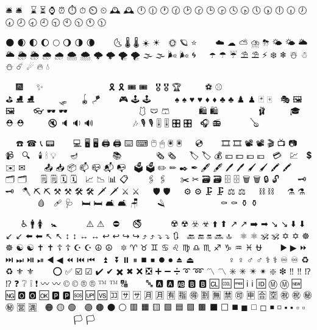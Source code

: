 \documentclass {article}
\begin{document}
{🛎️   🛎   🧳  ⌛  ⏳  ⌚  ⏰  ⏱️   ⏱   ⏲️   ⏲   🕰️   🕰   🕛  🕧  🕐  🕜  🕑  🕝  🕒  🕞  🕓
🕟  🕔  🕠  🕕  🕡  🕖  🕢  🕗  🕣  🕘  🕤  🕙  🕥  🕚  🕦

🌑  🌒  🌓  🌔  🌕  🌖  🌗  🌘  🌙  🌚  🌛  🌜  🌡️   🌡   ☀️   ☀   🌝  🌞  🪐  ⭐  🌟  🌠
🌌  ☁️   ☁   ⛅  ⛈️   ⛈   🌤️   🌤   🌥️   🌥   🌦️   🌦   🌧️   🌧   🌨️   🌨   🌩️   🌩   🌪️   🌪   🌫️   🌫
🌬️   🌬   🌀  🌈  🌂  ☂️   ☂   ☔  ⛱️   ⛱   ⚡  ❄️   ❄   ☃️   ☃   ⛄  ☄️   ☄   🔥  💧  🌊

🎃  🎄  🎆  🎇  🧨  ✨  🎈  🎉  🎊  🎋  🎍  🎎  🎏  🎐  🎑  🧧  🎀  🎁  🎗️   🎗   🎟️
🎟 🎫  🎖️   🎖   🏆  🏅  🥇  🥈  🥉 ⚽  ⚾  🥎  🏀  🏐  🏈  🏉  🎾  🥏  🎳  🏏  🏑  🏒
🥍  🏓  🏸  🥊  🥋  🥅  ⛳  ⛸️  ⛸ 🎣  🤿  🎽  🎿  🛷  🥌  🎯  🪀  🪁  🎱  🔮  🧿  🎮
🕹️  🕹  🎰  🎲  🧩  🧸  ♠️  ♠  ♥️  ♥ ♦️  ♦  ♣️  ♣  ♟️  ♟  🃏  🀄  🎴  🎭  🖼️  🖼  🎨  🧵
🧶 👓  🕶️  🕶  🥽  🥼  🦺  👔  👕  👖  🧣  🧤  🧥  🧦  👗  👘  🥻  🩱  🩲  🩳  👙  👚
👛 👜  👝  🛍️  🛍  🎒  👞  👟  🥾  🥿  👠  👡  🩰  👢  👑  👒  🎩  🎓  🧢  ⛑️  ⛑  📿
💄 💍  💎  🔇  🔈  🔉  🔊  📢  📣  📯  🔔  🔕  🎼  🎵  🎶  🎙️  🎙  🎚️  🎚  🎛️  🎛  🎤
🎧 📻  🎷  🎸  🎹  🎺  🎻  🪕  🥁

📱  📲  ☎️  ☎  📞  📟  📠  🔋  🔌  💻  🖥️  🖥  🖨️  🖨  ⌨️  ⌨  🖱️  🖱  🖲️  🖲  💽  💾  💿
📀  🧮  🎥  🎞️  🎞  📽️  📽  🎬  📺  📷  📸  📹  📼  🔍  🔎  🕯️  🕯  💡  🔦  🏮  🪔  📔
📕  📖  📗  📘  📙  📚  📓  📒  📃  📜  📄  📰  🗞️  🗞  📑  🔖  🏷️  🏷  💰  💴  💵  💶
💷  💸  💳  🧾  💹  💱  💲  ✉️  ✉  📧  📨  📩  📤  📥  📦  📫  📪  📬  📭  📮  🗳️  🗳
✏️  ✏  ✒️  ✒  🖋️  🖋  🖊️  🖊  🖌️  🖌  🖍️  🖍  📝  💼  📁  📂  🗂️  🗂  📅  📆  🗒️  🗒  🗓️
🗓  📇  📈  📉  📊  📋  📌  📍  📎  🖇️  🖇  📏  📐  ✂️  ✂  🗃️  🗃  🗄️  🗄  🗑️  🗑  🔒
🔓  🔏  🔐  🔑  🗝️  🗝  🔨  🪓  ⛏️  ⛏  ⚒️  ⚒  🛠️  🛠  🗡️  🗡  ⚔️  ⚔  🔫  🏹  🛡️  🛡  🔧
🔩  ⚙️  ⚙  🗜️  🗜  ⚖️  ⚖  🦯  🔗  ⛓️  ⛓  🧰  🧲  ⚗️  ⚗  🧪  🧫  🧬  🔬  🔭  📡  💉  🩸  💊
🩹  🩺  🚪  🛏️  🛏  🛋️  🛋  🪑  🚽  🚿  🛁  🪒  🧴  🧷  🧹  🧺  🧻  🧼  🧽  🧯  🛒  🚬
⚰️  ⚰  ⚱️  ⚱  🗿

🏧  🚮  🚰  ♿  🚹  🚺  🚻  🚼  🚾  🛂  🛃  🛄  🛅  ⚠️  ⚠  🚸  ⛔  🚫  🚳  🚭  🚯  🚱
🚷  📵  🔞  ☢️  ☢  ☣️  ☣    ⬆️  ⬆  ↗️  ↗  ➡️  ➡  ↘️  ↘  ⬇️  ⬇  ↙️  ↙  ⬅️  ⬅  ↖️  ↖  ↕️  ↕  ↔️  ↔
↩️  ↩  ↪️  ↪  ⤴️  ⤴  ⤵️  ⤵  🔃  🔄  🔙  🔚  🔛  🔜  🔝  🛐  ⚛️  ⚛  🕉️  🕉  ✡️  ✡  ☸️  ☸  ☯️  ☯
✝️  ✝  ☦️  ☦  ☪️  ☪  ☮️  ☮  🕎  🔯  ♈  ♉  ♊  ♋  ♌  ♍  ♎  ♏  ♐  ♑  ♒  ♓  ⛎  🔀
🔁  🔂  ▶️  ▶  ⏩  ⏭️  ⏭  ⏯️  ⏯  ◀️  ◀  ⏪  ⏮️  ⏮  🔼  ⏫  🔽  ⏬  ⏸️  ⏸  ⏹️  ⏹  ⏺️  ⏺  ⏏️  ⏏
🎦  🔅  🔆  📶  📳  📴  ♀️  ♀  ♂️  ♂    ⚕️  ⚕  ♾️  ♾  ♻️  ♻  ⚜️  ⚜  🔱  📛  🔰  ⭕  ✅  ☑️  ☑
✔️  ✔  ✖️  ✖  ❌  ❎  ➕  ➖  ➗  ➰  ➿  〽️  〽  ✳️  ✳  ✴️  ✴  ❇️  ❇  ‼️  ‼  ⁉️  ⁉  ❓  ❔
❕  ❗  〰️  〰  ©️  ©  ®️  ®  ™️  ™    🔠  🔡  🔢  🔣  🔤  🅰️  🅰  🆎  🅱️  🅱  🆑  🆒  🆓  ℹ️
ℹ  🆔  Ⓜ️  Ⓜ  🆕  🆖  🅾️  🅾  🆗  🅿️  🅿  🆘  🆙  🆚  🈁  🈂️  🈂  🈷️  🈷  🈶  🈯  🉐  🈹
🈚  🈲  🉑  🈸  🈴  🈳  ㊗️  ㊗  ㊙️  ㊙  🈺  🈵  🔴  🟠  🟡  🟢  🔵  🟣  🟤  ⚫  ⚪  🟥
🟧  🟨  🟩  🟦  🟪  🟫  ⬛  ⬜  ◼️  ◼  ◻️  ◻  ◾  ◽  ▪️  ▪  ▫️  ▫  🔶  🔷  🔸  🔹  🔺  🔻
💠  🔘  🔳  🔲  🏁  🚩  🎌  🏴  🏳️  🏳  🏴  🏴  🏴
}\vspace*{1em}
\end{document}
